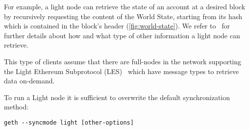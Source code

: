 For example, a light node can retrieve the state of an account at a desired
block by recursively requesting the content of the World State, starting from
its hash which is contained in the block's header (\autoref{fig:world-state}).
We refer to~\cite{bib:light-client} for further details about how and what type
of other information a light node can retrieve.

This type of clients assume that there are full-nodes in the network supporting
the Light Ethereum Subprotocol (LES)~\cite{bib:les-protocol} which have message
types to retrieve data on-demand.

To run a Light node it is sufficient to overwrite the default synchronization
method:
\begin{center}
    \verb|geth --syncmode light [other-options]|
\end{center}